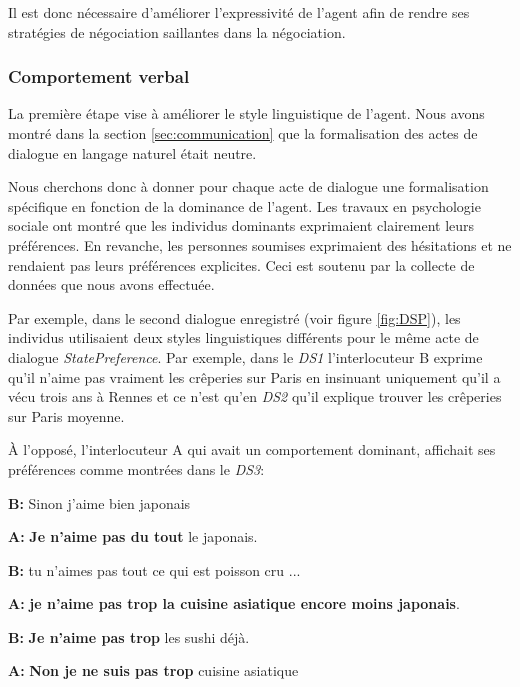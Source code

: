 Il est donc nécessaire d'améliorer l'expressivité de l'agent afin de rendre ses stratégies de négociation saillantes dans la négociation. 

\subsubsection{Comportement verbal}

La première étape vise à améliorer le style linguistique de l'agent. Nous avons montré dans la section \ref{sec:communication} que la formalisation des actes de dialogue en langage naturel était neutre. 

Nous cherchons donc à donner pour chaque acte de dialogue une formalisation spécifique en fonction de la dominance de l'agent. Les travaux en psychologie sociale ont montré que les individus dominants exprimaient clairement leurs préférences. En revanche, les personnes soumises exprimaient des hésitations et ne rendaient pas leurs préférences explicites.  Ceci est soutenu par la collecte de données que nous avons effectuée.

Par exemple, dans le second dialogue enregistré (voir figure \ref{fig:DSP}), les individus utilisaient deux styles linguistiques différents pour le même acte de dialogue \emph{StatePreference}. Par exemple, dans le \emph{DS1} l'interlocuteur B exprime qu'il n'aime pas vraiment les crêperies sur Paris en insinuant uniquement qu'il a vécu trois ans à Rennes et ce n'est qu'en \emph{DS2} qu'il explique trouver les crêperies sur Paris moyenne.

À l'opposé, l'interlocuteur A qui avait un comportement dominant, affichait ses préférences comme montrées dans le \emph{DS3}:

\begin{minipage}{\textwidth}     {\ttfamily
		
		\begin{addmargin}[1em]{2em}%
			
			\vspace{0.5em}
			
			\hspace*{3mm} \textbf{B:}  Sinon j'aime bien japonais 
			
			\textbf{A:} \textbf{Je n'aime pas du tout} le japonais.
			
			\hspace*{3mm} 
			\textbf{B:} tu n'aimes pas tout ce qui est poisson cru ... 
			
			\textbf{A:}  \textbf{je n'aime pas trop la cuisine asiatique encore moins japonais}.
			
			\hspace*{3mm} 
			\textbf{B:} \textbf{Je n'aime pas trop }les sushi déjà.
			
			\textbf{A:} \textbf{Non je ne suis pas trop} cuisine asiatique        \vspace{1.5em}      \end{addmargin}     } 
	
\end{minipage}

